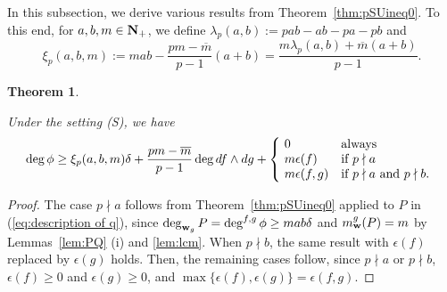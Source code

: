 \documentclass{amsart}
\theoremstyle{plain}
\newtheorem{thm}{Theorem}[section]
\theoremstyle{definition}
\newcommand{\ol}{\overline}
\newcommand{\N}{{\bf N}}
\newcommand{\ep}{\epsilon}
\newcommand{\w}{{\bf w}}
\begin{document}
In this subsection, 
we derive various results from Theorem~\ref{thm:pSUineq0}. 
To this end, 
for $a,b,m\in \N _+$, 
we define $\lambda _p(a,b):=pab-ab-pa-pb$ 
and 
$$
\xi _p(a,b,m):=
mab-\dfrac{pm-\ol{m}}{p-1}(a+b)
=\dfrac{m\lambda _p(a,b)+\ol{m}(a+b)}{p-1}.
$$


\begin{thm}\label{thm:pSUineq}

Under the setting {\rm (S)},
we have 
\begin{equation}\label{eq:thm:pSUineq}
\deg \phi \ge 
\xi _p(a,b,m)\delta 
+\frac{pm-\ol{m}}{p-1}\deg df\wedge dg
+\left\{ \!
\begin{array}{ll}
0& \text{\rm always}\\
m\ep (f)& \text{\rm if $p\nmid a$}\\
m\ep (f,g)& \text{\rm if $p\nmid a$ and $p\nmid b$}. 
\end{array}
\right.
\end{equation}
\end{thm}


\begin{proof}
The case $p\nmid a$ follows from Theorem~\ref{thm:pSUineq0} applied 
to $P$ in (\ref{eq:description of q}), 
since 
$\deg _{\w _g}P=\deg ^{f,g}\phi \ge mab\delta $ and $m_{\w }^g(P)=m$ 
by Lemmas~\ref{lem:PQ} (i) and \ref{lem:lcm}. 
When $p\nmid b$, 
the same result with $\ep (f)$ replaced by $\ep (g)$ holds. 
Then, 
the remaining cases follow, 
since $p\nmid a$ or $p\nmid b$, 
$\ep (f)\ge 0$ and $\ep (g)\ge 0$, 
and $\max \{ \ep (f),\ep (g)\} =\ep (f,g)$. 
\end{proof}
\end{document}
